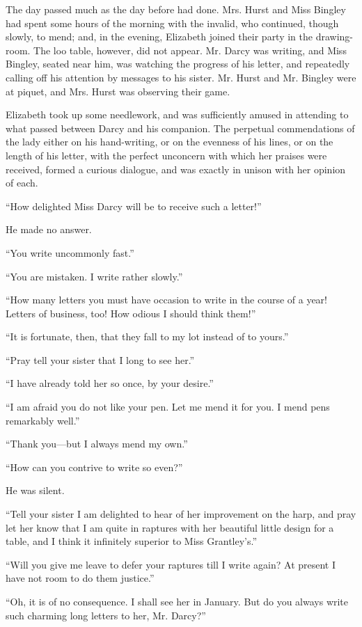 The day passed much as the day before had done. Mrs. Hurst and Miss Bingley had spent some hours of the morning with the invalid, who continued, though slowly, to mend; and, in the evening, Elizabeth joined their party in the drawing-room. The loo table, however, did not appear. Mr. Darcy was writing, and Miss Bingley, seated near him, was watching the progress of his letter, and repeatedly calling off his attention by messages to his sister. Mr. Hurst and Mr. Bingley were at piquet, and Mrs. Hurst was observing their game.

Elizabeth took up some needlework, and was sufficiently amused in attending to what passed between Darcy and his companion. The perpetual commendations of the lady either on his hand-writing, or on the evenness of his lines, or on the length of his letter, with the perfect unconcern with which her praises were received, formed a curious dialogue, and was exactly in unison with her opinion of each.

``How delighted Miss Darcy will be to receive such a letter!''

He made no answer.

``You write uncommonly fast.''

``You are mistaken. I write rather slowly.''

``How many letters you must have occasion to write in the course of a year! Letters of business, too! How odious I should think them!''

``It is fortunate, then, that they fall to my lot instead of to yours.''

``Pray tell your sister that I long to see her.''

``I have already told her so once, by your desire.''

``I am afraid you do not like your pen. Let me mend it for you. I mend pens remarkably well.''

``Thank you---but I always mend my own.''

``How can you contrive to write so even?''

He was silent.

``Tell your sister I am delighted to hear of her improvement on the harp, and pray let her know that I am quite in raptures with her beautiful little design for a table, and I think it infinitely superior to Miss Grantley's.''

``Will you give me leave to defer your raptures till I write again? At present I have not room to do them justice.''

``Oh, it is of no consequence. I shall see her in January. But do you always write such charming long letters to her, Mr. Darcy?''

